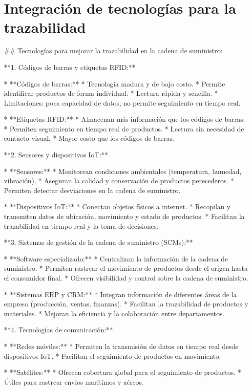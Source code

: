 \documentclass[main.tex]{subfiles}
\begin{document}
\section{Integración de tecnologías para la trazabilidad}

## Tecnologías para mejorar la trazabilidad en la cadena de suministro:

**1. Códigos de barras y etiquetas RFID:**

* **Códigos de barras:**
    * Tecnología madura y de bajo costo.
    * Permite identificar productos de forma individual.
    * Lectura rápida y sencilla.
    * Limitaciones: poca capacidad de datos, no permite seguimiento en tiempo real.

* **Etiquetas RFID:**
    * Almacenan más información que los códigos de barras.
    * Permiten seguimiento en tiempo real de productos.
    * Lectura sin necesidad de contacto visual.
    * Mayor costo que los códigos de barras.

**2. Sensores y dispositivos IoT:**

* **Sensores:**
    * Monitorean condiciones ambientales (temperatura, humedad, vibración).
    * Aseguran la calidad y conservación de productos perecederos.
    * Permiten detectar desviaciones en la cadena de suministro.

* **Dispositivos IoT:**
    * Conectan objetos físicos a internet.
    * Recopilan y transmiten datos de ubicación, movimiento y estado de productos.
    * Facilitan la trazabilidad en tiempo real y la toma de decisiones.

**3. Sistemas de gestión de la cadena de suministro (SCMs):**

* **Software especializado:**
    * Centralizan la información de la cadena de suministro.
    * Permiten rastrear el movimiento de productos desde el origen hasta el consumidor final.
    * Ofrecen visibilidad y control sobre la cadena de suministro.

* **Sistemas ERP y CRM:**
    * Integran información de diferentes áreas de la empresa (producción, ventas, finanzas).
    * Facilitan la trazabilidad de productos y materiales.
    * Mejoran la eficiencia y la colaboración entre departamentos.

**4. Tecnologías de comunicación:**

* **Redes móviles:**
    * Permiten la transmisión de datos en tiempo real desde dispositivos IoT.
    * Facilitan el seguimiento de productos en movimiento.

* **Satélites:**
    * Ofrecen cobertura global para el seguimiento de productos.
    * Útiles para rastrear envíos marítimos y aéreos.
\end{document}
